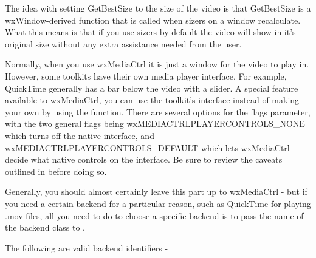 The idea with setting GetBestSize to the size of the video is
that GetBestSize is a wxWindow-derived function that is called
when sizers on a window recalculate. What this means is that
if you use sizers by default the video will show in it's
original size without any extra assistance needed from the user.


\label{playercontrolswxmediactrl}

Normally, when you use wxMediaCtrl it is just a window for the video to
play in.  However, some toolkits have their own media player interface.
For example, QuickTime generally has a bar below the video with a slider.
A special feature available to wxMediaCtrl, you can use the toolkit's interface instead of
making your own by using the 
function.  There are several options for the flags parameter, with
the two general flags being wxMEDIACTRLPLAYERCONTROLS\_NONE which turns off
the native interface, and wxMEDIACTRLPLAYERCONTROLS\_DEFAULT which lets
wxMediaCtrl decide what native controls on the interface. Be sure to review
the caveats outlined in  before
doing so.


\label{choosingbackendwxmediactrl}

Generally, you should almost certainly leave this part up to
wxMediaCtrl - but if you need a certain backend for a particular
reason, such as QuickTime for playing .mov files, all you need 
to do to choose a specific backend is to pass the
name of the backend class to 
.

The following are valid backend identifiers -
\twocolwidtha{7cm}
\begin{twocollist}\itemsep=0pt
\end{twocollist}

